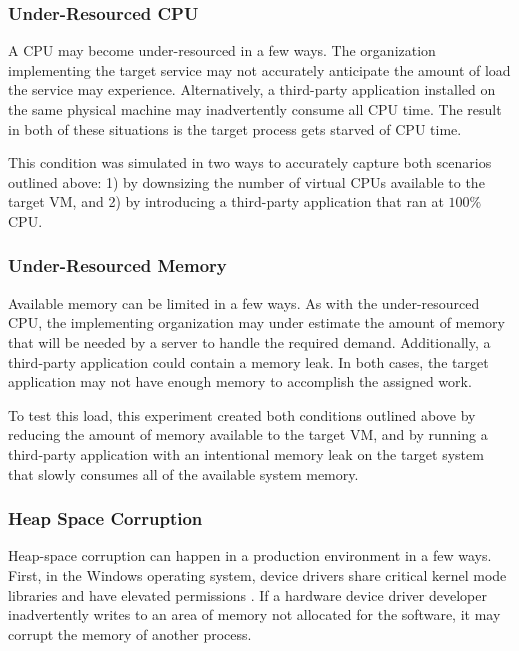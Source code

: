 \subsubsection{Under-Resourced \ac{CPU}} \label{sec:extUnderResourcedCPU}
A \ac{CPU} may become under-resourced in a few ways.  The organization
implementing the target service may not accurately anticipate the amount of
load the service may experience.  Alternatively, a third-party application
installed on the same physical machine may inadvertently consume all \ac{CPU}
time.  The result in both of these situations is the target process gets
starved of \ac{CPU} time.

This condition was simulated in two ways to accurately capture both scenarios
outlined above:  1) by downsizing the number of virtual \ac{CPU}s available
to the target \ac{VM}, and 2) by introducing a third-party application that
ran at $100\%$ \ac{CPU}.

\subsubsection{Under-Resourced Memory} \label{sec:extUnderResourcedMem}
Available memory can be limited in a few ways.  As with the under-resourced
\ac{CPU}, the implementing organization may under estimate the amount of memory
that will be needed by a server to handle the required demand.  Additionally, a
third-party application could contain a memory leak.  In both cases, the target
application may not have enough memory to accomplish the assigned work.

To test this load, this experiment created both conditions outlined above by
reducing the amount of memory available to the target \ac{VM}, and by running a
third-party application with an intentional memory leak on the target system
that slowly consumes all of the available system memory.

\subsubsection{Heap Space Corruption} \label{sec:extHeapSpaceCorrupt}
Heap-space corruption can happen in a production environment in a few ways.
First, in the Windows operating system, device drivers share critical kernel
mode libraries and have elevated permissions \citep{russinovich2009}.  If a
hardware device driver developer inadvertently writes to an area of memory not
allocated for the software, it may corrupt the memory of another process.

